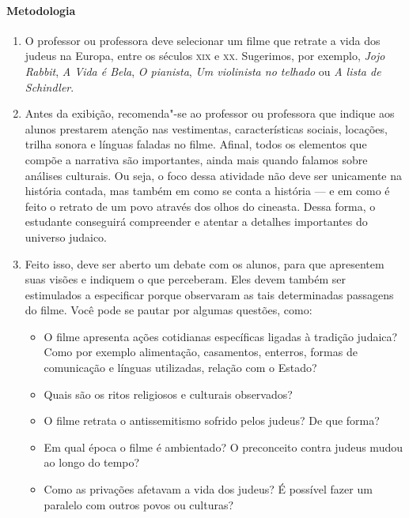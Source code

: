 \documentclass[12pt]{extarticle}
\begin{document}
\paragraph{Metodologia}

\begin{enumerate}
\item O professor ou professora deve selecionar um filme que retrate 
a vida dos judeus na Europa, entre os séculos \textsc{xix} e \textsc{xx}. Sugerimos, por exemplo,
\emph{Jojo Rabbit}, \emph{A Vida é Bela}, \emph{O pianista}, 
\emph{Um violinista no telhado} ou \emph{A lista de Schindler}. 

\item Antes da exibição, recomenda"-se ao
professor ou professora que indique aos alunos prestarem atenção nas 
vestimentas, características sociais, locações, trilha sonora e línguas 
faladas no filme. 
Afinal, todos os elementos que compõe a narrativa são importantes, 
ainda mais quando falamos sobre análises culturais. Ou seja, o foco 
dessa atividade não deve ser unicamente na
história contada, mas também em como se conta a história --- e em como é feito 
o retrato de um povo através dos olhos do cineasta. Dessa forma, o estudante
conseguirá compreender e atentar a detalhes importantes do universo judaico.

\item Feito isso, deve ser aberto um debate com os alunos, para que
apresentem suas visões e indiquem o que perceberam. Eles devem também ser
estimulados a especificar porque observaram as tais determinadas
passagens do filme. Você pode se pautar por algumas questões, como:

\begin{itemize}
\item O filme apresenta ações cotidianas específicas ligadas à tradição judaica? 
Como por exemplo alimentação, casamentos, enterros, formas de comunicação e 
línguas utilizadas, relação com o Estado?
\item Quais são os ritos religiosos e culturais observados?
\item O filme retrata o antissemitismo sofrido pelos judeus? De que forma?
\item Em qual época o filme é ambientado? O preconceito contra judeus 
mudou ao longo do tempo?
\item Como as privações afetavam a vida dos judeus? É possível fazer um 
paralelo com outros povos ou culturas?
\end{itemize}
\end{enumerate}
\end{document}
